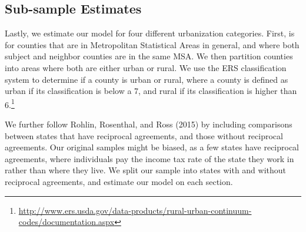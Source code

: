 \subsection{Sub-sample Estimates}

Lastly, we estimate our model for four different urbanization categories. First, is for counties that are in Metropolitan Statistical Areas in general, and where both subject and neighbor counties are in the same MSA. We then partition counties into areas where both are  either urban or rural. We use the ERS classification system to determine if a county is urban or rural, where a county is defined as urban if its classification is below a 7, and rural if its classification is higher than 6.\footnote{\url{http://www.ers.usda.gov/data-products/rural-urban-continuum-codes/documentation.aspx}}

We further follow Rohlin, Rosenthal, and Ross (2015) by including comparisons between states that have reciprocal agreements, and those without reciprocal agreements. Our original samples might be biased, as a few states have reciprocal agreements, where individuals pay the income tax rate of the state they work in rather than where they live. We split our sample into states with and without reciprocal agreements, and estimate our model on each section.

